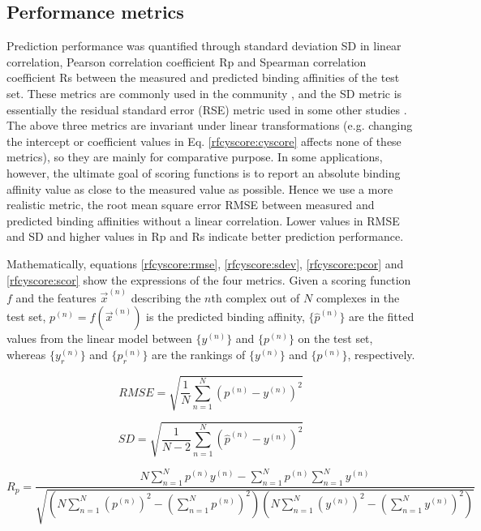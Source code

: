 \subsection{Performance metrics}

Prediction performance was quantified through standard deviation SD in linear correlation, Pearson correlation coefficient Rp and Spearman correlation coefficient Rs between the measured and predicted binding affinities of the test set. These metrics are commonly used in the community \citep{1313}, and the SD metric is essentially the residual standard error (RSE) metric used in some other studies \citep{963}. The above three metrics are invariant under linear transformations (e.g. changing the intercept or coefficient values in Eq. \eqref{rfcyscore:cyscore} affects none of these metrics), so they are mainly for comparative purpose. In some applications, however, the ultimate goal of scoring functions is to report an absolute binding affinity value as close to the measured value as possible. Hence we use a more realistic metric, the root mean square error RMSE between measured and predicted binding affinities without a linear correlation. Lower values in RMSE and SD and higher values in Rp and Rs indicate better prediction performance.

Mathematically, equations \eqref{rfcyscore:rmse}, \eqref{rfcyscore:sdev}, \eqref{rfcyscore:pcor} and \eqref{rfcyscore:scor} show the expressions of the four metrics. Given a scoring function $f$ and the features $\overrightarrow{x}^{(n)}$ describing the $n$th complex out of $N$ complexes in the test set, $p^{(n)}=f(\overrightarrow{x}^{(n)})$ is the predicted binding affinity, $\{\hat{p}^{(n)}\}$ are the fitted values from the linear model between $\{y^{(n)}\}$ and $\{p^{(n)}\}$ on the test set, whereas $\{y_r^{(n)}\}$ and $\{p_r^{(n)}\}$ are the rankings of $\{y^{(n)}\}$ and $\{p^{(n)}\}$, respectively.

\begin{equation}
RMSE = \sqrt{\frac{1}{N}\sum_{n=1}^N(p^{(n)}-y^{(n)})^2}
\label{rfcyscore:rmse}
\end{equation}

\begin{equation}
SD = \sqrt{\frac{1}{N-2}\sum_{n=1}^N(\hat{p}^{(n)}-y^{(n)})^2}
\label{rfcyscore:sdev}
\end{equation}

\begin{equation}
R_p = \frac{N\sum_{n=1}^Np^{(n)}y^{(n)}-\sum_{n=1}^Np^{(n)}\sum_{n=1}^Ny^{(n)}}{\sqrt{(N\sum_{n=1}^N(p^{(n)})^2-(\sum_{n=1}^Np^{(n)})^2)(N\sum_{n=1}^N(y^{(n)})^2-(\sum_{n=1}^Ny^{(n)})^2)}}
\label{rfcyscore:pcor}
\end{equation}

